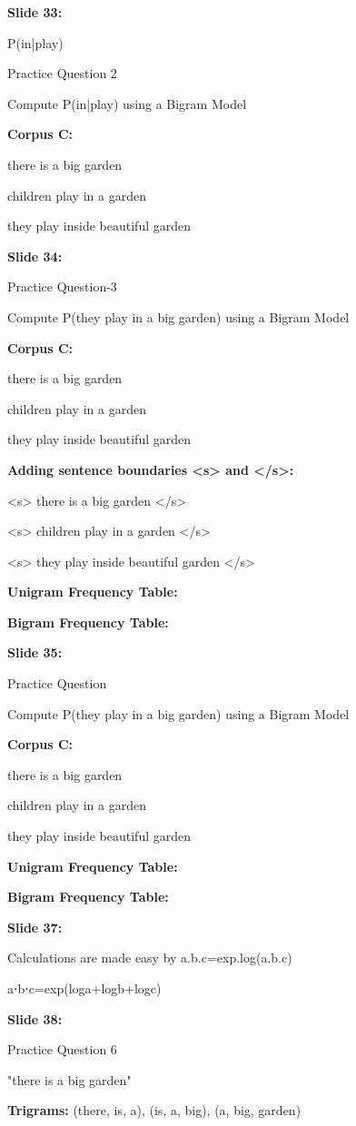 \documentclass[11pt,a4paper]{article}
\begin{document}
\textbf{Slide 33:}

P(in|play)

Practice Question 2

Compute P(in|play) using a Bigram Model

\textbf{Corpus C:} 

there is a big garden

children play in a garden

they play inside beautiful garden

\textbf{Slide 34:}

Practice Question-3

Compute P(they play in a big garden) using a Bigram Model

\textbf{Corpus C:} 

there is a big garden

children play in a garden

they play inside beautiful garden

\textbf{Adding sentence boundaries <s> and </s>:} 

<s> there is a big garden </s>

<s> children play in a garden </s>

<s> they play inside beautiful garden </s>

\textbf{Unigram Frequency Table:} 

\textbf{Bigram Frequency Table:} 

\textbf{Slide 35:}

Practice Question

Compute P(they play in a big garden) using a Bigram Model

\textbf{Corpus C:} 

there is a big garden

children play in a garden

they play inside beautiful garden

\textbf{Unigram Frequency Table:} 

\textbf{Bigram Frequency Table:} 

\textbf{Slide 37:}

Calculations are made easy by a.b.c=exp.log(a.b.c)

a⋅b⋅c=exp(loga+logb+logc)

\textbf{Slide 38:}

Practice Question 6

"there is a big garden"

\textbf{Trigrams:}  (there, is, a), (is, a, big), (a, big, garden)
\end{document}
